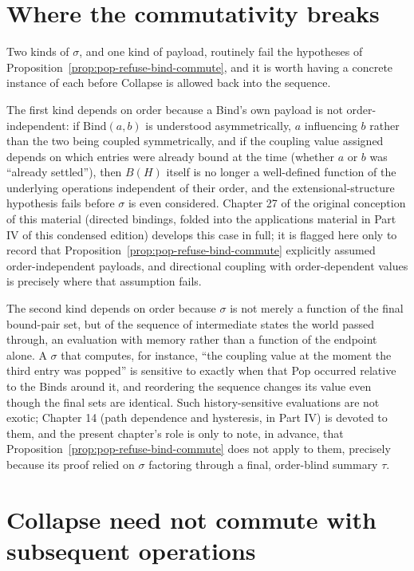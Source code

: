 \documentclass[11pt]{book}
\begin{document}
\section{Where the commutativity breaks}

Two kinds of $\sigma$, and one kind of payload, routinely fail the hypotheses of Proposition~\ref{prop:pop-refuse-bind-commute}, and it is worth having a concrete instance of each before Collapse is allowed back into the sequence.

The first kind depends on order because a Bind's own payload is not order-independent: if $\mathrm{Bind}(a,b)$ is understood asymmetrically, $a$ influencing $b$ rather than the two being coupled symmetrically, and if the coupling value assigned depends on which entries were already bound at the time (whether $a$ or $b$ was ``already settled''), then $B(H)$ itself is no longer a well-defined function of the underlying operations independent of their order, and the extensional-structure hypothesis fails before $\sigma$ is even considered. Chapter 27 of the original conception of this material (directed bindings, folded into the applications material in Part IV of this condensed edition) develops this case in full; it is flagged here only to record that Proposition~\ref{prop:pop-refuse-bind-commute} explicitly assumed order-independent payloads, and directional coupling with order-dependent values is precisely where that assumption fails.

The second kind depends on order because $\sigma$ is not merely a function of the final bound-pair set, but of the sequence of intermediate states the world passed through, an evaluation with memory rather than a function of the endpoint alone. A $\sigma$ that computes, for instance, ``the coupling value at the moment the third entry was popped'' is sensitive to exactly when that Pop occurred relative to the Binds around it, and reordering the sequence changes its value even though the final sets are identical. Such history-sensitive evaluations are not exotic; Chapter 14 (path dependence and hysteresis, in Part IV) is devoted to them, and the present chapter's role is only to note, in advance, that Proposition~\ref{prop:pop-refuse-bind-commute} does not apply to them, precisely because its proof relied on $\sigma$ factoring through a final, order-blind summary $\tau$.

\section{Collapse need not commute with subsequent operations}
\end{document}
